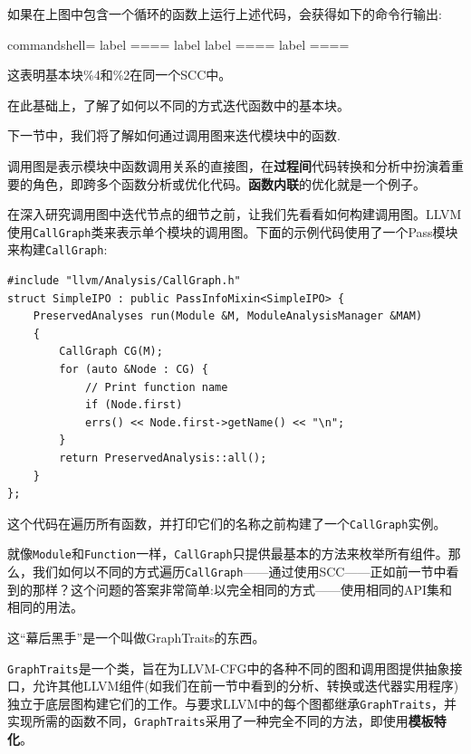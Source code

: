 如果在上图中包含一个循环的函数上运行上述代码，会获得如下的命令行输出:

\begin{tcblisting}{commandshell={}}
label %
====
label %
label %
====
label %
====
\end{tcblisting}

这表明基本块\%4和\%2在同一个SCC中。

在此基础上，了解了如何以不同的方式迭代函数中的基本块。

下一节中，我们将了解如何通过调用图来迭代模块中的函数.


调用图是表示模块中函数调用关系的直接图，在\textbf{过程间}代码转换和分析中扮演着重要的角色，即跨多个函数分析或优化代码。\textbf{函数内联}的优化就是一个例子。

在深入研究调用图中迭代节点的细节之前，让我们先看看如何构建调用图。LLVM使用\texttt{CallGraph}类来表示单个模块的调用图。下面的示例代码使用了一个Pass模块来构建\texttt{CallGraph}:

\begin{lstlisting}[style=styleCXX]
#include "llvm/Analysis/CallGraph.h"
struct SimpleIPO : public PassInfoMixin<SimpleIPO> {
	PreservedAnalyses run(Module &M, ModuleAnalysisManager &MAM)
	{
		CallGraph CG(M);
		for (auto &Node : CG) {
			// Print function name
			if (Node.first)
			errs() << Node.first->getName() << "\n";
		}
		return PreservedAnalysis::all();
	}
};
\end{lstlisting}

这个代码在遍历所有函数，并打印它们的名称之前构建了一个\texttt{CallGraph}实例。

就像\texttt{Module}和\texttt{Function}一样，\texttt{CallGraph}只提供最基本的方法来枚举所有组件。那么，我们如何以不同的方式遍历\texttt{CallGraph}——通过使用SCC——正如前一节中看到的那样？这个问题的答案非常简单:以完全相同的方式——使用相同的API集和相同的用法。

这“幕后黑手”是一个叫做GraphTraits的东西。


\texttt{GraphTraits}是一个类，旨在为LLVM-CFG中的各种不同的图和调用图提供抽象接口，允许其他LLVM组件(如我们在前一节中看到的分析、转换或迭代器实用程序)独立于底层图构建它们的工作。与要求LLVM中的每个图都继承\texttt{GraphTraits}，并实现所需的函数不同，\texttt{GraphTraits}采用了一种完全不同的方法，即使用\textbf{模板特化}。

